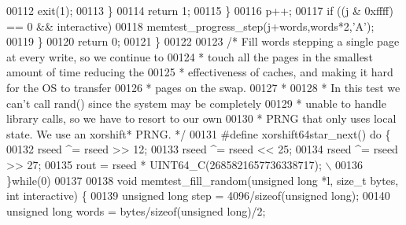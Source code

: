 \begin{DoxyCode}
{{{00112                 exit(1);
00113             \}
00114             \textcolor{keywordflow}{return} 1;
00115         \}
00116         p++;
00117         \textcolor{keywordflow}{if} ((j & 0xffff) == 0 && interactive)
00118             memtest\_progress\_step(j+words,words*2,\textcolor{stringliteral}{'A'});
00119     \}
00120     \textcolor{keywordflow}{return} 0;
00121 \}
00122 
00123 \textcolor{comment}{/* Fill words stepping a single page at every write, so we continue to}
00124 \textcolor{comment}{ * touch all the pages in the smallest amount of time reducing the}
00125 \textcolor{comment}{ * effectiveness of caches, and making it hard for the OS to transfer}
00126 \textcolor{comment}{ * pages on the swap.}
00127 \textcolor{comment}{ *}
00128 \textcolor{comment}{ * In this test we can't call rand() since the system may be completely}
00129 \textcolor{comment}{ * unable to handle library calls, so we have to resort to our own}
00130 \textcolor{comment}{ * PRNG that only uses local state. We use an xorshift* PRNG. */}
00131 \textcolor{preprocessor}{#}\textcolor{preprocessor}{define} \textcolor{preprocessor}{xorshift64star\_next}\textcolor{preprocessor}{(}\textcolor{preprocessor}{)} \textcolor{keywordflow}{do} \textcolor{preprocessor}{\{}
00132         \textcolor{preprocessor}{rseed} \textcolor{preprocessor}{^=} \textcolor{preprocessor}{rseed} \textcolor{preprocessor}{>>} 12\textcolor{preprocessor}{;}
00133         \textcolor{preprocessor}{rseed} \textcolor{preprocessor}{^=} \textcolor{preprocessor}{rseed} \textcolor{preprocessor}{<<} 25\textcolor{preprocessor}{;}
00134         \textcolor{preprocessor}{rseed} \textcolor{preprocessor}{^=} \textcolor{preprocessor}{rseed} \textcolor{preprocessor}{>>} 27\textcolor{preprocessor}{;}
00135         \textcolor{preprocessor}{rout} \textcolor{preprocessor}{=} \textcolor{preprocessor}{rseed} \textcolor{preprocessor}{*} UINT64\_C\textcolor{preprocessor}{(}2685821657736338717\textcolor{preprocessor}{)}\textcolor{preprocessor}{;} \textcolor{preprocessor}{\(\backslash\)}
00136 \textcolor{preprocessor}{\}}\textcolor{keywordflow}{while}\textcolor{preprocessor}{(}0\textcolor{preprocessor}{)}
00137 
00138 \textcolor{keywordtype}{void} memtest\_fill\_random(\textcolor{keywordtype}{unsigned} \textcolor{keywordtype}{long} *l, size\_t bytes, \textcolor{keywordtype}{int} interactive) \{
00139     \textcolor{keywordtype}{unsigned} \textcolor{keywordtype}{long} step = 4096/\textcolor{keyword}{sizeof}(\textcolor{keywordtype}{unsigned} \textcolor{keywordtype}{long});
00140     \textcolor{keywordtype}{unsigned} \textcolor{keywordtype}{long} words = bytes/\textcolor{keyword}{sizeof}(\textcolor{keywordtype}{unsigned} \textcolor{keywordtype}{long})/2;
}}}
\end{DoxyCode}
